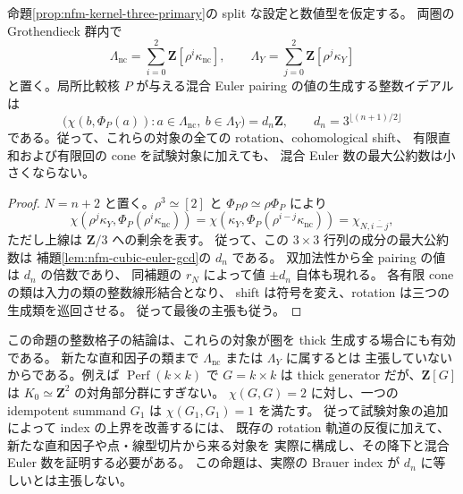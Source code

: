 \begin{proposition}
\label{prop:nfm-kernel-euler-orbit-lattice}
命題\ref{prop:nfm-kernel-three-primary}の split な設定と数値型を仮定する。
両圏の Grothendieck 群内で
\[
 \Lambda_{\mathrm{nc}}
  =\sum_{i=0}^2\mathbf Z[\rho^i\kappa_{\mathrm{nc}}],\qquad
 \Lambda_Y=\sum_{j=0}^2\mathbf Z[\rho^j\kappa_Y]
\]
と置く。局所比較核 $P$ が与える混合 Euler pairing の値の生成する整数イデアルは
\[
 \bigl(\chi(b,\Phi_P(a)):
          a\in\Lambda_{\mathrm{nc}},\ b\in\Lambda_Y\bigr)
       =d_n\mathbf Z,
 \qquad d_n=3^{\lfloor(n+1)/2\rfloor}
\]
である。従って、これらの対象の全ての rotation、cohomological shift、
有限直和および有限回の cone を試験対象に加えても、
混合 Euler 数の最大公約数は小さくならない。
\end{proposition}

\begin{proof}
$N=n+2$ と置く。$\rho^3\simeq[2]$ と $\Phi_P\rho\simeq\rho\Phi_P$ により
\[
 \chi(\rho^j\kappa_Y,\Phi_P(\rho^i\kappa_{\mathrm{nc}}))
   =\chi(\kappa_Y,\Phi_P(\rho^{i-j}\kappa_{\mathrm{nc}}))
   =\chi_{N,\overline{i-j}},
\]
ただし上線は $\mathbf Z/3$ への剰余を表す。
従って、この $3\times3$ 行列の成分の最大公約数は
補題\ref{lem:nfm-cubic-euler-gcd}の $d_n$ である。
双加法性から全 pairing の値は $d_n$ の倍数であり、
同補題の $r_N$ によって値 $\pm d_n$ 自体も現れる。
各有限 cone の類は入力の類の整数線形結合となり、
shift は符号を変え、rotation は三つの生成類を巡回させる。
従って最後の主張も従う。
\end{proof}

\begin{remark}
この命題の整数格子の結論は、これらの対象が圏を thick 生成する場合にも有効である。
新たな直和因子の類まで $\Lambda_{\mathrm{nc}}$ または $\Lambda_Y$ に属するとは
主張していないからである。例えば $\operatorname{Perf}(k\times k)$ で
$G=k\times k$ は thick generator だが、$\mathbf Z[G]$ は
$K_0\simeq\mathbf Z^2$ の対角部分群にすぎない。
$\chi(G,G)=2$ に対し、一つの idempotent summand $G_1$ は
$\chi(G_1,G_1)=1$ を満たす。
従って試験対象の追加によって index の上界を改善するには、
既存の rotation 軌道の反復に加えて、新たな直和因子や点・線型切片から来る対象を
実際に構成し、その降下と混合 Euler 数を証明する必要がある。
この命題は、実際の Brauer index が $d_n$ に等しいとは主張しない。
\end{remark}

